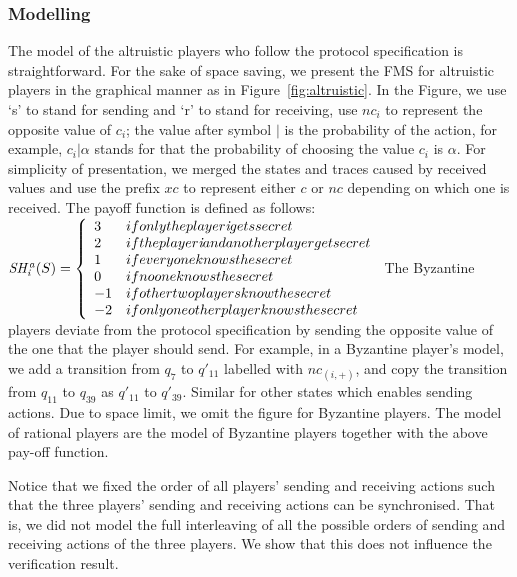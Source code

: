 \subsubsection{Modelling}
The model of the altruistic players who follow the protocol specification is straightforward.
For the sake of space saving, we present the FMS for altruistic players in the graphical manner as
in Figure~\ref{fig:altruistic}. In the Figure, we use `s' to stand for sending and `r' to stand for receiving,
use $nc_i$ to represent the opposite value of $c_i$; the value after symbol $|$ is the probability of the action, for example, $c_i|\alpha$ stands for that the probability of choosing the value $c_i$ is $\alpha$. For simplicity of presentation, we merged the states and traces caused by
received values and use the prefix $xc$ to represent either $c$ or $nc$ depending on which one is received.
The payoff function is defined as follows: \\
$\mathit{SH^a_i}(S)=\left\{\begin{array}{ll}
3 & \relax{if only the player \textit{i} gets secret}\\
2 &\relax{if the player \textit{i} and another player get secret}\\
1 &\relax{if everyone knows the secret}\\
0 &\relax{if no one knows the secret}\\
-1 & \relax{if other two players know the secret} \\
-2 & \relax{if only one other player knows the secret} 
\end{array}\right. $
%
The Byzantine players deviate from the protocol specification by sending the opposite 
value of the one that the player should send. For example, in a Byzantine player's model,
we add a transition from $q_7$ to $q'_{11}$ labelled with $nc_{(i,+)}$, and copy the transition
from $q_{11}$ to $q_{39}$ as $q'_{11}$ to $q'_{39}$. Similar for other states which enables
sending actions. Due to space limit, we omit the figure for Byzantine players.
The model of rational players are the model of Byzantine players together with the above pay-off function.

Notice that we fixed the order of all players' sending and receiving actions such that 
the three players' sending and receiving actions can be synchronised. That is, we
did not model the full interleaving of all the possible 
orders of sending and receiving actions of the three players. We show that this does
not influence the verification result.


